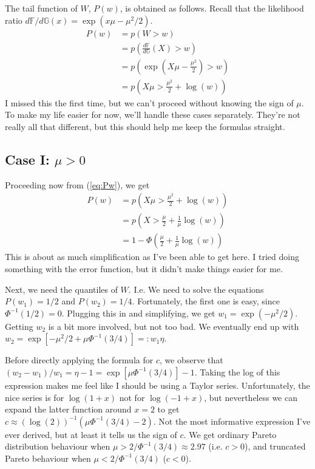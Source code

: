 \documentclass{article}
\newcommand{\bG}{\mathbb{G}}
\newcommand{\bF}{\mathbb{F}}
\newcommand{\dfdg}{d \bF / d \bG}
\begin{document}
The tail function of $W$, $P(w)$, is obtained as follows. Recall that the likelihood ratio $\dfdg(x) = \exp(x \mu - \mu^2 / 2)$.
%
\begin{align}
    P(w) &= p(W > w)\\
    &= p \left( \frac{d \bF}{d \bG}(X) > w \right)\\
    &= p \left( \exp(X \mu - \frac{\mu^2}{2}) > w \right)\\
    &= p \left( X \mu > \frac{\mu^2}{2} + \log(w) \right) \label{eq:Pw}
\end{align}
%
I missed this the first time, but we can't proceed without knowing the sign of $\mu$. To make my life easier for now, we'll handle these cases separately. They're not really all that different, but this should help me keep the formulas straight.

\subsection{Case I: $\mu > 0$}

Proceeding now from (\ref{eq:Pw}), we get
%
\begin{align}
    P(w) &= p \left( X \mu > \frac{\mu^2}{2} + \log(w) \right)\\
    &= p \left( X > \frac{\mu}{2} + \frac{1}{\mu} \log(w) \right)\\
    &= 1 - \Phi \left( \frac{\mu}{2} + \frac{1}{\mu} \log(w) \right)
\end{align}
%
This is about as much simplification as I've been able to get here. I tried doing something with the error function, but it didn't make things easier for me.

Next, we need the quantiles of $W$. I.e. We need to solve the equations $P(w_1) = 1/2$ and $P(w_2) = 1/4$. Fortunately, the first one is easy, since $\Phi^{-1}(1/2) = 0$. Plugging this in and simplifying, we get $w_1 = \exp(-\mu^2 / 2)$. Getting $w_2$ is a bit more involved, but not too bad. We eventually end up with $w_2 = \exp[-\mu^2 / 2 + \mu \Phi^{-1}(3/4)] =: w_1 \eta$. 

Before directly applying the formula for $c$, we observe that $(w_2 - w_1)/w_1 = \eta - 1 = \exp[\mu \Phi^{-1}(3/4)] - 1$. Taking the log of this expression makes me feel like I should be using a Taylor series. Unfortunately, the nice series is for $\log(1+x)$ not for $\log(-1 + x)$, but nevertheless we can expand the latter function around $x=2$ to get $c \approx (\log(2))^{-1} (\mu \Phi^{-1}(3/4) - 2)$. Not the most informative expression I've ever derived, but at least it tells us the sign of $c$. We get ordinary Pareto distribution behaviour when $\mu > 2 / \Phi^{-1}(3/4) \approx 2.97$ (i.e. $c>0$), and truncated Pareto behaviour when $\mu < 2 / \Phi^{-1}(3/4)$ ($c<0$).
\end{document}
